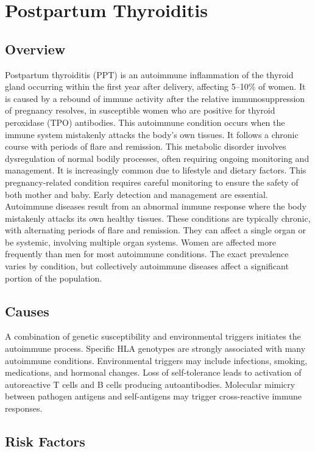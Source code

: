\chapter{Postpartum Thyroiditis}
\label{sec:Postpartum Thyroiditis}

\section{Overview}
Postpartum thyroiditis (PPT) is an autoimmune inflammation of the thyroid gland occurring within the first year after delivery, affecting 5--10\% of women. It is caused by a rebound of immune activity after the relative immunosuppression of pregnancy resolves, in susceptible women who are positive for thyroid peroxidase (TPO) antibodies. This autoimmune condition occurs when the immune system mistakenly attacks the body's own tissues. It follows a chronic course with periods of flare and remission. This metabolic disorder involves dysregulation of normal bodily processes, often requiring ongoing monitoring and management. It is increasingly common due to lifestyle and dietary factors. This pregnancy-related condition requires careful monitoring to ensure the safety of both mother and baby. Early detection and management are essential. Autoimmune diseases result from an abnormal immune response where the body mistakenly attacks its own healthy tissues. These conditions are typically chronic, with alternating periods of flare and remission. They can affect a single organ or be systemic, involving multiple organ systems. Women are affected more frequently than men for most autoimmune conditions. The exact prevalence varies by condition, but collectively autoimmune diseases affect a significant portion of the population.
\section{Causes}
A combination of genetic susceptibility and environmental triggers initiates the autoimmune process. Specific HLA genotypes are strongly associated with many autoimmune conditions. Environmental triggers may include infections, smoking, medications, and hormonal changes. Loss of self-tolerance leads to activation of autoreactive T cells and B cells producing autoantibodies. Molecular mimicry between pathogen antigens and self-antigens may trigger cross-reactive immune responses.
\section{Risk Factors}

